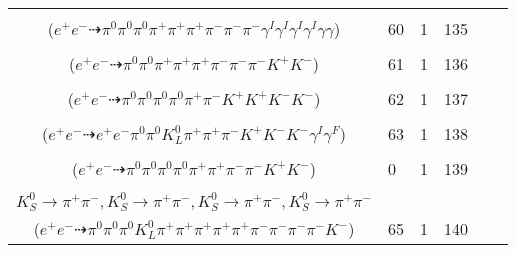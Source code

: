 \documentclass[landscape]{article}
\newcounter{rownumbers}
\newcommand\rn{\stepcounter{rownumbers}\arabic{rownumbers}}
\newcommand{\EOL}{\\} %
\newcommand{\topoTags}[1]{#1} %
\begin{document}
\begin{longtable}{clcccc}
\rn & \makecell[l]{ $ 
e^{+} e^{-} \rightarrow \pi^{0} \pi^{0} \rho^{0} \rho^{0} \pi^{+} \rho^{-} \eta \gamma^{I} \gamma^{I} \gamma^{I} \gamma^{I} ,
\rho^{0} \rightarrow \pi^{+} \pi^{-} ,
\rho^{0} \rightarrow \pi^{+} \pi^{-} ,
\rho^{-} \rightarrow \pi^{0} \pi^{-} ,
\eta \rightarrow \gamma \gamma 
$ \\ ($
e^{+} e^{-} \dashrightarrow \pi^{0} \pi^{0} \pi^{0} \pi^{+} \pi^{+} \pi^{+} \pi^{-} \pi^{-} \pi^{-} \gamma^{I} \gamma^{I} \gamma^{I} \gamma^{I} \gamma \gamma 
$) } & \topoTags{60 & }1 & 135 \EOL

\rn & \makecell[l]{ $ 
e^{+} e^{-} \rightarrow \pi^{0} \pi^{0} \rho^{0} \pi^{+} \pi^{-} \pi^{-} \bar{K}^{*} K^{+} ,
\rho^{0} \rightarrow \pi^{+} \pi^{-} ,
\bar{K}^{*} \rightarrow \pi^{+} K^{-} 
$ \\ ($
e^{+} e^{-} \dashrightarrow \pi^{0} \pi^{0} \pi^{+} \pi^{+} \pi^{+} \pi^{-} \pi^{-} \pi^{-} K^{+} K^{-} 
$) } & \topoTags{61 & }1 & 136 \EOL

\rn & \makecell[l]{ $ 
e^{+} e^{-} \rightarrow \pi^{0} \pi^{0} \pi^{0} \pi^{-} \rho^{+} K^{+} K^{-} \phi ,
\rho^{+} \rightarrow \pi^{0} \pi^{+} ,
\phi \rightarrow K^{+} K^{-} 
$ \\ ($
e^{+} e^{-} \dashrightarrow \pi^{0} \pi^{0} \pi^{0} \pi^{0} \pi^{+} \pi^{-} K^{+} K^{+} K^{-} K^{-} 
$) } & \topoTags{62 & }1 & 137 \EOL

\rn & \makecell[l]{ $ 
e^{+} e^{-} \rightarrow \pi^{0} \pi^{0} \omega K^{0} \bar{K}^{*} \phi \gamma^{I} ,
\pi^{0} \rightarrow e^{+} e^{-} \gamma^{F} ,
\omega \rightarrow \pi^{0} \pi^{+} \pi^{-} ,
K^{0} \rightarrow K_{L}^{0} ,
\bar{K}^{*} \rightarrow \pi^{+} K^{-} ,
\phi \rightarrow K^{+} K^{-} 
$ \\ ($
e^{+} e^{-} \dashrightarrow e^{+} e^{-} \pi^{0} \pi^{0} K_{L}^{0} \pi^{+} \pi^{+} \pi^{-} K^{+} K^{-} K^{-} \gamma^{I} \gamma^{F} 
$) } & \topoTags{63 & }1 & 138 \EOL

\rn & \makecell[l]{ $ 
e^{+} e^{-} \rightarrow \pi^{0} \pi^{0} \rho^{+} \omega K^{*} K^{-} ,
\rho^{+} \rightarrow \pi^{0} \pi^{+} ,
\omega \rightarrow \pi^{0} \pi^{+} \pi^{-} ,
K^{*} \rightarrow \pi^{-} K^{+} 
$ \\ ($
e^{+} e^{-} \dashrightarrow \pi^{0} \pi^{0} \pi^{0} \pi^{0} \pi^{+} \pi^{+} \pi^{-} \pi^{-} K^{+} K^{-} 
$) } & \topoTags{0 & }1 & 139 \EOL

\rn & \makecell[l]{ $ 
e^{+} e^{-} \rightarrow \pi^{0} \pi^{0} \pi^{+} K^{0} K^{0} \bar{K}^{0} K^{*-} \phi ,
K^{0} \rightarrow K_{S}^{0} ,
K^{0} \rightarrow K_{S}^{0} ,
\bar{K}^{0} \rightarrow K_{S}^{0} ,
K^{*-} \rightarrow \pi^{0} K^{-} ,
\phi \rightarrow K_{L}^{0} K_{S}^{0} ,
$ \\ $
K_{S}^{0} \rightarrow \pi^{+} \pi^{-} ,
K_{S}^{0} \rightarrow \pi^{+} \pi^{-} ,
K_{S}^{0} \rightarrow \pi^{+} \pi^{-} ,
K_{S}^{0} \rightarrow \pi^{+} \pi^{-} 
$ \\ ($
e^{+} e^{-} \dashrightarrow \pi^{0} \pi^{0} \pi^{0} K_{L}^{0} \pi^{+} \pi^{+} \pi^{+} \pi^{+} \pi^{+} \pi^{-} \pi^{-} \pi^{-} \pi^{-} K^{-} 
$) } & \topoTags{65 & }1 & 140 \EOL


\end{longtable}
\end{document}
